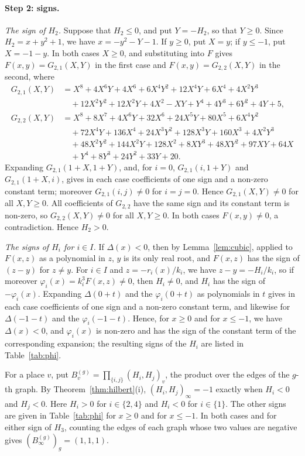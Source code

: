 \documentclass[11pt]{article}
\begin{document}
\paragraph{Step 2: signs.} \emph{The sign of $H_{2}$.} Suppose that $H_{2}\leq0$, and put $Y=-H_{2}$, so that $Y\geq0$. Since $H_{2}=x+y^{2}+1$, we have $x=-y^{2}-Y-1$. If $y\geq0$, put $X=y$; if $y\leq-1$, put $X=-1-y$. In both cases $X\geq0$, and substituting into $F$ gives $F(x,y)=G_{2,1}(X,Y)$ in the first case and $F(x,y)=G_{2,2}(X,Y)$ in the second, where
\begin{align*}
G_{2,1}(X,Y)&=X^{8}+4X^{6}Y+4X^{6}+6X^{4}Y^{2}+12X^{4}Y+6X^{4}+4X^{2}Y^{3}\\
&\quad+12X^{2}Y^{2}+12X^{2}Y+4X^{2}-XY+Y^{4}+4Y^{3}+6Y^{2}+4Y+5,\\
G_{2,2}(X,Y)&=X^{8}+8X^{7}+4X^{6}Y+32X^{6}+24X^{5}Y+80X^{5}+6X^{4}Y^{2}\\
&\quad+72X^{4}Y+136X^{4}+24X^{3}Y^{2}+128X^{3}Y+160X^{3}+4X^{2}Y^{3}\\
&\quad+48X^{2}Y^{2}+144X^{2}Y+128X^{2}+8XY^{3}+48XY^{2}+97XY+64X\\
&\quad+Y^{4}+8Y^{3}+24Y^{2}+33Y+20.
\end{align*}
Expanding $G_{2,1}(1+X,1+Y)$, and, for $i=0$, $G_{2,1}(i,1+Y)$ and $G_{2,1}(1+X,i)$, gives in each case coefficients of one sign and a non-zero constant term; moreover $G_{2,1}(i,j)\neq0$ for $i=j=0$. Hence $G_{2,1}(X,Y)\neq0$ for all $X,Y\geq0$. All coefficients of $G_{2,2}$ have the same sign and its constant term is non-zero, so $G_{2,2}(X,Y)\neq0$ for all $X,Y\geq0$. In both cases $F(x,y)\neq0$, a contradiction. Hence $H_{2}>0$.

\emph{The signs of $H_i$ for $i\in I$.} If $\Delta(x)<0$, then by Lemma~\ref{lem:cubic}, applied to $F(x,z)$ as a polynomial in $z$, $y$ is its only real root, and $F(x,z)$ has the sign of $(z-y)$ for $z\neq y$. For $i\in I$ and $z=-r_i(x)/k_i$, we have $z-y=-H_i/k_i$, so if moreover $\varphi_i(x)=k_i^3F(x,z)\neq0$, then $H_i\neq0$, and $H_i$ has the sign of $-\varphi_i(x)$. Expanding $\Delta(0+t)$ and the $\varphi_i(0+t)$ as polynomials in $t$ gives in each case coefficients of one sign and a non-zero constant term, and likewise for $\Delta(-1-t)$ and the $\varphi_i(-1-t)$. Hence, for $x\geq0$ and for $x\leq-1$, we have $\Delta(x)<0$, and $\varphi_i(x)$ is non-zero and has the sign of the constant term of the corresponding expansion; the resulting signs of the $H_i$ are listed in Table~\ref{tab:phi}. 

For a place $v$, put $B^{(g)}_v=\prod_{\{i,j\}}(H_i,H_j)_v$, the product over the edges of the $g$-th graph. By Theorem~\ref{thm:hilbert}(i), $(H_i,H_j)_\infty=-1$ exactly when $H_i<0$ and $H_j<0$. Here $H_i>0$ for $i\in\{2,\allowbreak 4\}$ and $H_i<0$ for $i\in\{1\}$. The other signs are given in Table~\ref{tab:phi} for $x\geq0$ and for $x\leq-1$. In both cases and for either sign of $H_{3}$, counting the edges of each graph whose two values are negative gives $(B^{(g)}_\infty)_g=(1,1,1)$.
\end{document}
